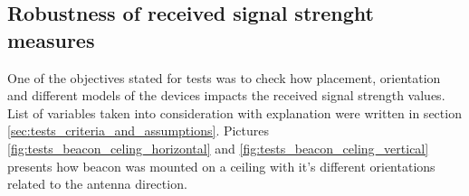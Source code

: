 \documentclass[../main.tex]{subfiles}
\begin{document}
\FloatBarrier

\subsection{Robustness of received signal strenght measures} %
\label{sub:robustness_of_received_signal_strenght_measures}


One of the objectives stated for tests was to check how placement, orientation and different models of the devices impacts the received signal strength values. List of variables taken into consideration with explanation were written in section \ref{sec:tests_criteria_and_assumptions}. Pictures \ref{fig:tests_beacon_celing_horizontal} and \ref{fig:tests_beacon_celing_vertical} presents how beacon was mounted on a ceiling with it's different orientations related to the antenna direction.
\end{document}
